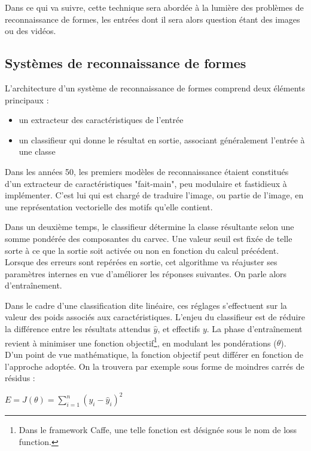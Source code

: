 \documentclass[12pt]{report}
\begin{document}
Dans ce qui va suivre, cette technique sera abordée à la lumière des problèmes de reconnaissance de formes, les entrées dont il sera alors question étant des images ou des vidéos.

\subsection{Systèmes de reconnaissance de formes}

L'architecture d'un système de reconnaissance de formes comprend deux éléments principaux :

\begin{itemize}
  \item un extracteur des caractéristiques de l'entrée
  \item un classifieur qui donne le résultat en sortie, associant généralement l'entrée à une classe
\end{itemize}



Dans les années 50, les premiers modèles de reconnaissance étaient constitués d'un extracteur de caractéristiques "fait-main", peu modulaire et fastidieux à implémenter\cite{Bib_LeCun}.
C'est lui qui est chargé de traduire l'image, ou partie de l'image, en une représentation vectorielle des motifs qu'elle contient.
\par
Dans un deuxième temps, le classifieur détermine la classe résultante selon une somme pondérée des composantes du \gls{carvec}.
Une valeur seuil est fixée de telle sorte à ce que la sortie soit activée ou non en fonction du calcul précédent.
Lorsque des erreurs sont repérées en sortie, cet algorithme va réajuster ses paramètres internes en vue d'améliorer les réponses suivantes. On parle alors d'entraînement.
\par
Dans le cadre d'une classification dite linéaire, ces réglages s'effectuent sur la valeur des poids associés aux caractéristiques.
L'enjeu du classifieur est de réduire la différence entre les résultats attendus $\hat{y}$, et effectifs $y$.
La phase d'entraînement revient à minimiser une fonction objectif\footnote{Dans le framework Caffe, une telle fonction est désignée sous le nom de loss function.}, en modulant les pondérations ($\theta$).
D'un point de vue mathématique, la fonction objectif peut différer en fonction de l'approche adoptée. On la trouvera par exemple sous forme de moindres carrés de résidus\cite{Bib_WikiLS} :

\begin{center} $ E = J({\theta}) =  \sum\limits_{i=1}^{n} (y_{i} - \hat{y}_{i} )^2 $ \end{center}
\end{document}
